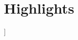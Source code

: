 \section{Highlights}

\begin{onecolentry}
    \begin{highlightsforbulletentries}

    \item [[ highlights.summary ]]

    \end{highlightsforbulletentries}
\end{onecolentry}
